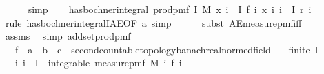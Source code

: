 \begin{isabellebody}
\ \ \ \ \isamarkupfalse%
\ simp\isanewline
\ \ \isamarkupfalse%
\ {\isachardoublequoteopen}has{\isacharunderscore}{\kern0pt}bochner{\isacharunderscore}{\kern0pt}integral\ {\isacharparenleft}{\kern0pt}prod{\isacharunderscore}{\kern0pt}pmf\ I\ M{\isacharparenright}{\kern0pt}\ {\isacharparenleft}{\kern0pt}{\isasymlambda}x{\isachardot}{\kern0pt}\ {\isacharparenleft}{\kern0pt}{\isasymProd}i\ {\isasymin}\ I{\isachardot}{\kern0pt}\ f\ i\ {\isacharparenleft}{\kern0pt}x\ i{\isacharparenright}{\kern0pt}{\isacharparenright}{\kern0pt}{\isacharparenright}{\kern0pt}\ {\isacharparenleft}{\kern0pt}{\isasymProd}i\ {\isasymin}\ I{\isachardot}{\kern0pt}\ r\ i{\isacharparenright}{\kern0pt}{\isachardoublequoteclose}\isanewline
\ \ \ \ \isamarkupfalse%
\ {\isacharparenleft}{\kern0pt}rule\ has{\isacharunderscore}{\kern0pt}bochner{\isacharunderscore}{\kern0pt}integralI{\isacharunderscore}{\kern0pt}AE{\isacharbrackleft}{\kern0pt}OF\ a{\isacharbrackright}{\kern0pt}{\isacharcomma}{\kern0pt}\ simp{\isacharparenright}{\kern0pt}\isanewline
\ \ \ \ \isamarkupfalse%
\ {\isacharparenleft}{\kern0pt}subst\ AE{\isacharunderscore}{\kern0pt}measure{\isacharunderscore}{\kern0pt}pmf{\isacharunderscore}{\kern0pt}iff{\isacharparenright}{\kern0pt}\isanewline
\ \ \ \ \isamarkupfalse%
\ assms\ \isamarkupfalse%
\ {\isacharparenleft}{\kern0pt}simp\ add{\isacharcolon}{\kern0pt}set{\isacharunderscore}{\kern0pt}prod{\isacharunderscore}{\kern0pt}pmf{\isacharparenright}{\kern0pt}\isanewline
{}\isamarkupfalse%
%
\endisatagproof
{\isafoldproof}%
%
\isadelimproof
\isanewline
%
\endisadelimproof
\isanewline
{}\isamarkupfalse%
\isanewline
\ \ \ f\ {\isacharcolon}{\kern0pt}{\isacharcolon}{\kern0pt}\ {\isachardoublequoteopen}{\isacharprime}{\kern0pt}a\ {\isasymRightarrow}\ {\isacharprime}{\kern0pt}b\ {\isasymRightarrow}\ {\isacharparenleft}{\kern0pt}{\isacharprime}{\kern0pt}c\ {\isacharcolon}{\kern0pt}{\isacharcolon}{\kern0pt}\ {\isacharbraceleft}{\kern0pt}second{\isacharunderscore}{\kern0pt}countable{\isacharunderscore}{\kern0pt}topology{\isacharcomma}{\kern0pt}banach{\isacharcomma}{\kern0pt}real{\isacharunderscore}{\kern0pt}normed{\isacharunderscore}{\kern0pt}field{\isacharbraceright}{\kern0pt}{\isacharparenright}{\kern0pt}{\isachardoublequoteclose}\isanewline
\ \ \ {\isachardoublequoteopen}finite\ I{\isachardoublequoteclose}\isanewline
\ \ \ {\isachardoublequoteopen}{\isasymAnd}i{\isachardot}{\kern0pt}\ i\ {\isasymin}\ I\ {\isasymLongrightarrow}\ integrable\ {\isacharparenleft}{\kern0pt}measure{\isacharunderscore}{\kern0pt}pmf\ {\isacharparenleft}{\kern0pt}M\ i{\isacharparenright}{\kern0pt}{\isacharparenright}{\kern0pt}\ {\isacharparenleft}{\kern0pt}f\ i{\isacharparenright}{\kern0pt}{\isachardoublequoteclose}\isanewline

\end{isabellebody}
